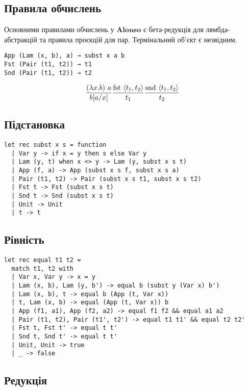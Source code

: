 \documentclass{article}
\begin{document}
\subsection{Правила обчислень}

Основними правилами обчислень у $\mathbf{Alonso}$ є бета-редукція для лямбда-абстракцій та правила проєкцій для пар. Термінальний об’єкт є незвідним.

\begin{lstlisting}[mathescape=true]
App (Lam (x, b), a) → subst x a b
Fst (Pair (t1, t2)) → t1
Snd (Pair (t1, t2)) → t2
\end{lstlisting}

$$
\frac{(\lambda x . b)\ a}{b [a/x]} \\[10pt]
\frac{\text{fst}\ \langle t_1, t_2 \rangle}{t_1} \\[10pt]
\frac{\text{snd}\ \langle t_1, t_2 \rangle}{t_2}
$$

\newpage
\subsection{Підстановка}

\begin{lstlisting}[mathescape=true]
let rec subst x s = function
  | Var y -> if x = y then s else Var y
  | Lam (y, t) when x <> y -> Lam (y, subst x s t)
  | App (f, a) -> App (subst x s f, subst x s a)
  | Pair (t1, t2) -> Pair (subst x s t1, subst x s t2)
  | Fst t -> Fst (subst x s t)
  | Snd t -> Snd (subst x s t)
  | Unit -> Unit
  | t -> t
\end{lstlisting}

\subsection{Рівність}

\begin{lstlisting}[mathescape=true]
let rec equal t1 t2 =
  match t1, t2 with
  | Var x, Var y -> x = y
  | Lam (x, b), Lam (y, b') -> equal b (subst y (Var x) b')
  | Lam (x, b), t -> equal b (App (t, Var x))
  | t, Lam (x, b) -> equal (App (t, Var x)) b
  | App (f1, a1), App (f2, a2) -> equal f1 f2 && equal a1 a2
  | Pair (t1, t2), Pair (t1', t2') -> equal t1 t1' && equal t2 t2'
  | Fst t, Fst t' -> equal t t'
  | Snd t, Snd t' -> equal t t'
  | Unit, Unit -> true
  | _ -> false
\end{lstlisting}

\subsection{Редукція}
\end{document}
